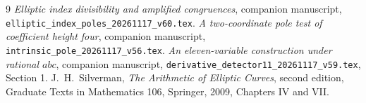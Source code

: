 \documentclass[11pt,a4paper]{article}
\begin{document}
\begin{thebibliography}{9}
\emph{Elliptic index divisibility and amplified congruences},
companion manuscript,
\nolinkurl{elliptic_index_poles_20261117_v60.tex}.
\emph{A two-coordinate pole test of coefficient
height four}, companion manuscript,
\nolinkurl{intrinsic_pole_20261117_v56.tex}.
\emph{An eleven-variable construction under
rational $abc$}, companion manuscript,
\nolinkurl{derivative_detector11_20261117_v59.tex}, Section 1.
J.~H.~Silverman, \emph{The Arithmetic of Elliptic Curves},
second edition, Graduate Texts in Mathematics 106, Springer, 2009,
Chapters IV and VII.
\end{thebibliography}
\end{document}
